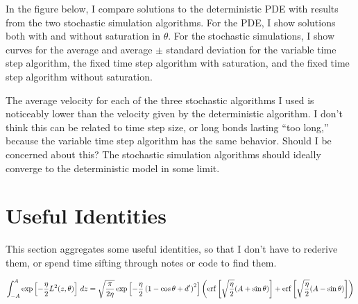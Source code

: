 \documentclass{article}
\newcommand{\dd}{d}
\newcommand{\Int}[4]{\int_{#3}^{#4} #1 \, \dd #2}
\newcommand{\tn}{\textnormal}
\DeclareMathOperator{\erf}{erf}
\begin{document}
In the figure below, I compare solutions to the deterministic PDE with
results from the two stochastic simulation algorithms. For the PDE, I
show solutions both with and without saturation in $\theta$. For the
stochastic simulations, I show curves for the average and average
$\pm$ standard deviation for the variable time step algorithm, the
fixed time step algorithm with saturation, and the fixed time step
algorithm without saturation. 

The average velocity for each of the three stochastic algorithms I used is
noticeably lower than the velocity given by the deterministic
algorithm. I don't think this can be related to time step size, or
long bonds lasting ``too long,'' because the variable time step
algorithm has the same behavior. Should I be concerned about this? The
stochastic simulation algorithms should ideally converge to the
deterministic model in some limit. 

\section{Useful Identities}
\label{sec:useful-identities}

This section aggregates some useful identities, so that I don't have
to rederive them, or spend time sifting through notes or code to find
them.

\begin{equation}
  \label{eq:total-fm-rate}
  \Int{\exp\left[-\frac{\onForceScale}{2} \length^2(\ndWallDist,
      \recAngle) \right]} {\ndWallDist} {-\domLength} {\domLength} =
  \sqrt{\frac{\pi}{2\onForceScale}} \exp\left[-\frac{\onForceScale}{2}
    \left(1 - \cos\recAngle + \ndSeparation\right)^2 \right] \left(
    \erf\left[\sqrt{\frac{\onForceScale}{2}} (\domLength +
        \sin\recAngle)\right] +
      \erf\left[\sqrt{\frac{\onForceScale}{2}} (\domLength -
        \sin\recAngle)\right] \right)
\end{equation}
\end{document}
